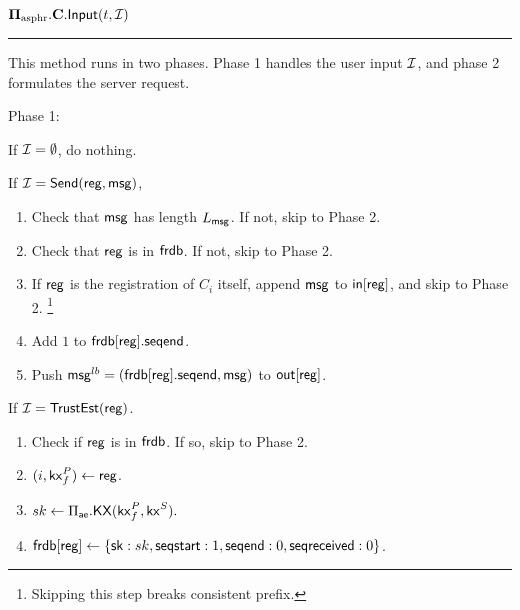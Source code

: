 \begin{definition}
\vspace{10pt}
$\mathbf{\Pi_{\text{asphr}}.C.\mathsf{Input}}(t, \mathcal{I})$
\vspace{5pt}
\hrule
\vspace{5pt}
This method runs in two phases. Phase 1 handles the user input $\mathcal{I}$, and phase 2 formulates the server request.

Phase 1: 

If $\mathcal{I} = \emptyset$, do nothing. 

If $\mathcal{I} = \mathsf{Send}(\mathsf{reg}, \mathsf{msg})$, 

\begin{enumerate}
    \item Check that $\mathsf{msg}$ has length $L_{\mathsf{msg}}$. If not, skip to Phase 2.
    \item Check that $\mathsf{reg}$ is in $\mathsf{frdb}$. If not, skip to Phase 2.
    \item If $\mathsf{reg}$ is the registration of $C_i$ itself, append $\mathsf{msg}$ to $\mathsf{in}[\mathsf{reg}]$, and skip to Phase 2. \footnote{Skipping this step breaks consistent prefix.}
    \item Add $1$ to $\mathsf{frdb}[\mathsf{reg}].\mathsf{seqend}$. 
    \item Push $\mathsf{msg}^{lb} = (\mathsf{frdb}[\mathsf{reg}].\mathsf{seqend}, \mathsf{msg})$ to $\mathsf{out}[\mathsf{reg}]$.
\end{enumerate}

If $\mathcal{I} = \mathsf{TrustEst}(\mathsf{reg})$.
\begin{enumerate}
    \item Check if $\mathsf{reg}$ is in $\mathsf{frdb}$. If so, skip to Phase 2.
    \item $(i, \mathsf{kx}_f^P) \leftarrow \mathsf{reg}$.
    \item $sk \leftarrow \Pi_{\mathsf{ae}}.\mathsf{KX}(\mathsf{kx}_f^P, \mathsf{kx}^S).$
    \item $\mathsf{frdb}[\mathsf{reg}] \leftarrow \{{\mathsf{sk}}: sk,  \mathsf{seqstart}: 1, \mathsf{seqend}: 0, \mathsf{seqreceived}: 0\}$.
\end{enumerate}


\end{definition}
